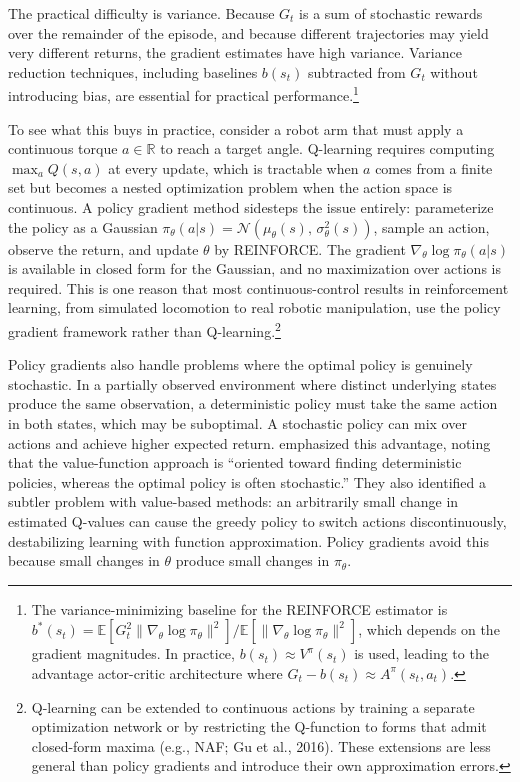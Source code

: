The practical difficulty is variance. Because $G_t$ is a sum of stochastic rewards over the remainder of the episode, and because different trajectories may yield very different returns, the gradient estimates have high variance. Variance reduction techniques, including baselines $b(s_t)$ subtracted from $G_t$ without introducing bias, are essential for practical performance.\footnote{The variance-minimizing baseline for the REINFORCE estimator is $b^*(s_t) = \mathbb{E}[G_t^2 \|\nabla_\theta \log \pi_\theta\|^2] / \mathbb{E}[\|\nabla_\theta \log \pi_\theta\|^2]$, which depends on the gradient magnitudes. In practice, $b(s_t) \approx V^\pi(s_t)$ is used, leading to the advantage actor-critic architecture where $G_t - b(s_t) \approx A^\pi(s_t, a_t)$.}

To see what this buys in practice, consider a robot arm that must apply a continuous torque $a \in \mathbb{R}$ to reach a target angle. Q-learning requires computing $\max_a Q(s,a)$ at every update, which is tractable when $a$ comes from a finite set but becomes a nested optimization problem when the action space is continuous. A policy gradient method sidesteps the issue entirely: parameterize the policy as a Gaussian $\pi_\theta(a|s) = \mathcal{N}(\mu_\theta(s),\, \sigma_\theta^2(s))$, sample an action, observe the return, and update $\theta$ by REINFORCE. The gradient $\nabla_\theta \log \pi_\theta(a|s)$ is available in closed form for the Gaussian, and no maximization over actions is required. This is one reason that most continuous-control results in reinforcement learning, from simulated locomotion to real robotic manipulation, use the policy gradient framework rather than Q-learning.\footnote{Q-learning can be extended to continuous actions by training a separate optimization network or by restricting the Q-function to forms that admit closed-form maxima (e.g., NAF; Gu et al., 2016). These extensions are less general than policy gradients and introduce their own approximation errors.}

Policy gradients also handle problems where the optimal policy is genuinely stochastic. In a partially observed environment where distinct underlying states produce the same observation, a deterministic policy must take the same action in both states, which may be suboptimal. A stochastic policy can mix over actions and achieve higher expected return. \citet{SuttonMcAllester2000} emphasized this advantage, noting that the value-function approach is ``oriented toward finding deterministic policies, whereas the optimal policy is often stochastic.'' They also identified a subtler problem with value-based methods: an arbitrarily small change in estimated Q-values can cause the greedy policy to switch actions discontinuously, destabilizing learning with function approximation. Policy gradients avoid this because small changes in $\theta$ produce small changes in $\pi_\theta$.

